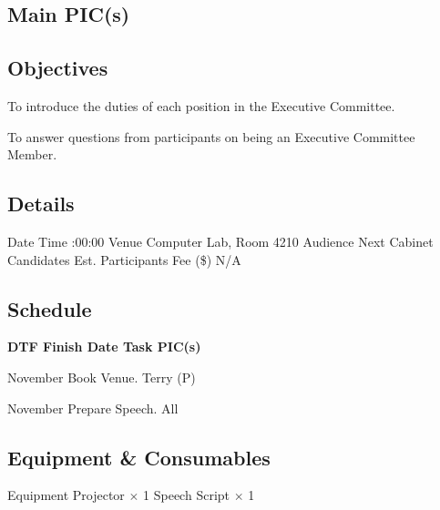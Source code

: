 \startsection[title={CSESS Information Session}][
date={\date[d=21, m=11, y=2023][event]},
pic={Terry (P)}]

\subsection{Main PIC(s)}

\subsection{Objectives}
\startitemize
\item To introduce the duties of each position in the Executive Committee.
\item To answer questions from participants on being an Executive Committee Member.
\stopitemize

\subsection{Details}
\starttabulate[|rB|l|]
\NC Date
\NC {} \NR
\NC Time
:00:00 \NR
\NC Venue
\NC Computer Lab, Room 4210 \NR
\NC Audience
\NC Next Cabinet Candidates \NR
\NC Est. Participants
 \NR
\NC Fee (\$)
\NC N/A \NR
\stoptabulate

\subsection{Schedule}

\setupTABLE[c][1][width=0.75in]
\setupTABLE[c][2][width=1in]
\setupTABLE[c][3][width=3in]
\setupTABLE[c][4][width=1.25in]
\bTABLE
\bTABLEhead

\bTR\bTH    \bf{DTF}
\eTH\bTH    \bf{Finish Date}
\eTH\bTH    \bf{Task}
\eTH\bTH    \bf{PIC(s)}
\eTH\eTR

\eTABLEhead
\bTABLEbody

\bTR{}
\eTD{} November
\eTD\bTD Book Venue.
\eTD\bTD Terry (P)
\eTD\eTR

\bTR{}
\eTD{} November
\eTD\bTD Prepare Speech.
\eTD\bTD All
\eTD\eTR

\eTABLEbody
\eTABLE

\subsection{Equipment \& Consumables}
\starttabulate[|l|l|]
\NC{}Equipment\NC\NR
\HL
\NC Projector \NC $\times$ 1 \NR
\NC Speech Script \NC $\times$ 1 \NR
\HL
\stoptabulate

